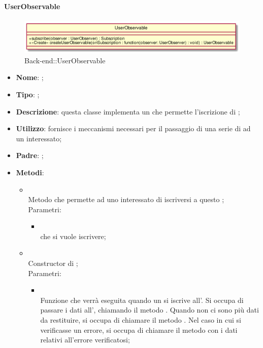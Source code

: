 \hypertarget{UserObservable_label}{\paragraph{UserObservable}}
\begin{figure}[h]
	\centering
	\includegraphics[width=\textwidth,height=\textheight,keepaspectratio]{images/ClassUserObservable.png}
	\caption{Back-end::UserObservable}
\end{figure}
\begin{itemize}
	\item \textbf{Nome}: ;
	\item \textbf{Tipo}: ;
	\item \textbf{Descrizione}: questa classe implementa un  che permette l'iscrizione di ;
	\item \textbf{Utilizzo}: fornisce i meccanismi necessari per il passaggio di una serie di  ad un  interessato;
	\item \textbf{Padre}: ;
	\item \textbf{Metodi}:
	\begin{itemize}
		\item[]  \\
		Metodo che permette ad uno  interessato di iscriversi a questo ;\\
		Parametri:
		\begin{itemize}
			\item {} \\
			 che si vuole iscrivere;
		\end{itemize}
		\item[]  \\
		Constructor di ;\\
		Parametri:
		\begin{itemize}
			\item {} \\
			Funzione che verrà eseguita quando un  si iscrive all'. Si occupa di passare i dati all', chiamando il metodo . Quando non ci sono più dati da restituire, si occupa di chiamare il metodo . Nel caso in cui si verificasse un errore, si occupa di chiamare il metodo  con i dati relativi all'errore verificatosi;
		\end{itemize}
	\end{itemize}
\end{itemize}
\FloatBarrier

